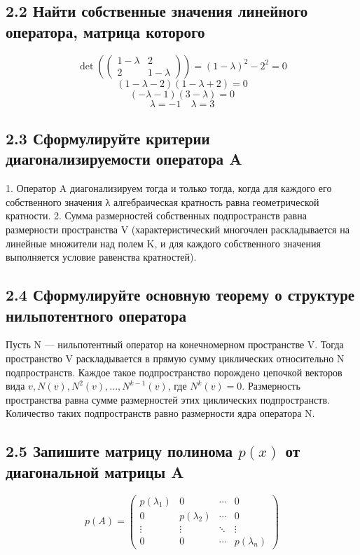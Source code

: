 \documentclass{article}
\begin{document}
\subsection*{2.2 Найти собственные значения линейного оператора, матрица которого}
\[\det \left( \begin{pmatrix}
1-\lambda & 2 \\
2 & 1-\lambda
\end{pmatrix} \right) = (1-\lambda)^2 - 2^2 = 0\]
\[(1-\lambda - 2)(1-\lambda + 2) = 0\]
\[(-\lambda - 1)(3-\lambda) = 0\]
\[\lambda = -1 \quad \lambda = 3\]

\subsection*{2.3 Сформулируйте критерии диагонализируемости оператора A}
1. Оператор A диагонализируем тогда и только тогда, когда для каждого его собственного значения λ алгебраическая кратность равна геометрической кратности.
2. Сумма размерностей собственных подпространств равна размерности пространства V (характеристический многочлен раскладывается на линейные множители над полем K, и для каждого собственного значения выполняется условие равенства кратностей).

\subsection*{2.4 Сформулируйте основную теорему о структуре нильпотентного оператора}
Пусть N — нильпотентный оператор на конечномерном пространстве V. Тогда пространство V раскладывается в прямую сумму циклических относительно N подпространств. Каждое такое подпространство порождено цепочкой векторов вида \(v, N(v), N^2(v), ..., N^{k-1}(v)\), где \(N^k(v) = 0\). Размерность пространства равна сумме размерностей этих циклических подпространств. Количество таких подпространств равно размерности ядра оператора N.

\subsection*{2.5 Запишите матрицу полинома \(p(x)\) от диагональной матрицы A}
\[p(A) =
\begin{pmatrix}
p(\lambda_1) & 0 & \cdots & 0 \\
0 & p(\lambda_2) & \cdots & 0 \\
\vdots & \vdots & \ddots & \vdots \\
0 & 0 & \cdots & p(\lambda_n)
\end{pmatrix}\]
\end{document}
